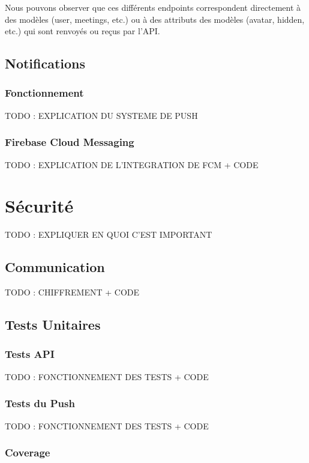 \documentclass[french]{article}
\begin{document}
	Nous pouvons observer que ces différents endpoints correspondent directement à des modèles (user, meetings, etc.) ou à des attributs des modèles (avatar, hidden, etc.) qui sont renvoyés ou reçus par l'API. 
	
	\subsection{Notifications}
	\subsubsection{Fonctionnement}
	
	TODO : EXPLICATION DU SYSTEME DE PUSH
	
	\subsubsection{Firebase Cloud Messaging}
	
	TODO : EXPLICATION DE L'INTEGRATION DE FCM + CODE
	
	
	
	\section{Sécurité}
	
	TODO : EXPLIQUER EN QUOI C'EST IMPORTANT
	
	\subsection{Communication}
	
	TODO : CHIFFREMENT + CODE
	
	\subsection{Tests Unitaires}
	\subsubsection{Tests API}
	
	TODO : FONCTIONNEMENT DES TESTS + CODE
	
	\subsubsection{Tests du Push}
	
	TODO : FONCTIONNEMENT DES TESTS + CODE
	
	\subsubsection{Coverage}
	
\end{document}
